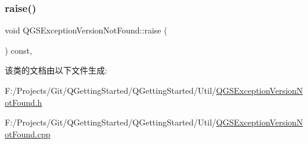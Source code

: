 \subsubsection{\texorpdfstring{raise()}{raise()}}
{\footnotesize\ttfamily void Q\+G\+S\+Exception\+Version\+Not\+Found\+::raise (\begin{DoxyParamCaption}{ }\end{DoxyParamCaption}) const\hspace{0.3cm}{\ttfamily [override]}, {\ttfamily [virtual]}}



该类的文档由以下文件生成\+:\begin{DoxyCompactItemize}
\item 
F\+:/\+Projects/\+Git/\+Q\+Getting\+Started/\+Q\+Getting\+Started/\+Util/\mbox{\hyperlink{_q_g_s_exception_version_not_found_8h}{Q\+G\+S\+Exception\+Version\+Not\+Found.\+h}}\item 
F\+:/\+Projects/\+Git/\+Q\+Getting\+Started/\+Q\+Getting\+Started/\+Util/\mbox{\hyperlink{_q_g_s_exception_version_not_found_8cpp}{Q\+G\+S\+Exception\+Version\+Not\+Found.\+cpp}}\end{DoxyCompactItemize}
